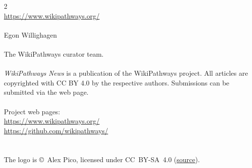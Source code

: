 \documentclass[a4paper]{report}
\begin{document}
\date{MONTH YEAR}

\titlepage

\begin{article}
  
\end{article}

\newpage

\begin{article}
  
\end{article}

\newpage

\begin{article}
  
\end{article}

\newpage

\begin{article}
  
\end{article}

\begin{bottombox}
\begin{multicols}{2}
\\
\url{https://www.wikipathways.org/} \\
\\
Egon Willighagen \\
\\
The WikiPathways curator team.\\
\\
\emph{WikiPathways News} is a publication of the WikiPathways project.
All articles are copyrighted with CC BY 4.0 by the respective authors.
Submissions can be submitted via the web page.\\
\\
\WP Project web pages:\\
\url{https://www.wikipathways.org/} \\
\url{https://github.com/wikipathways/}\\
\\
\\
The \WP logo is \copyright\ Alex Pico, licensed under
CC~BY-SA~4.0 (\href{https://commons.wikimedia.org/wiki/File:Wplogo_500.png}{source}).
\end{multicols}
\end{bottombox}
\end{document}
